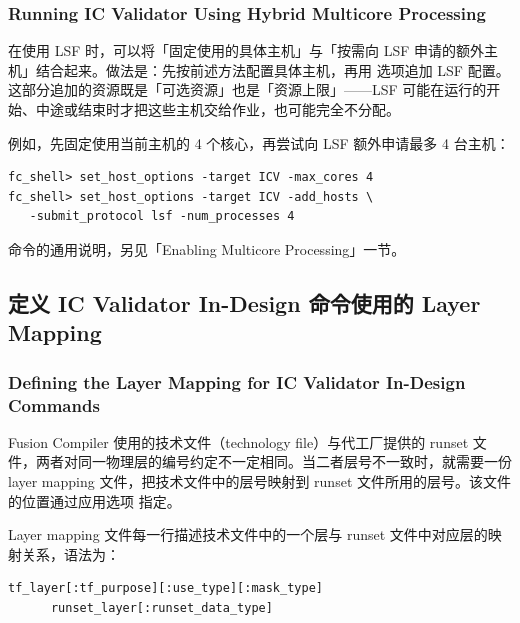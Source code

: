 \subsubsection*{Running IC Validator Using Hybrid Multicore Processing}

在使用 LSF 时，可以将「固定使用的具体主机」与「按需向 LSF 申请的额外主机」结合起来。做法是：先按前述方法配置具体主机，再用  选项追加 LSF 配置。这部分追加的资源既是「可选资源」也是「资源上限」——LSF 可能在运行的开始、中途或结束时才把这些主机交给作业，也可能完全不分配。

例如，先固定使用当前主机的 4 个核心，再尝试向 LSF 额外申请最多 4 台主机：
\begin{lstlisting}
fc_shell> set_host_options -target ICV -max_cores 4
fc_shell> set_host_options -target ICV -add_hosts \
   -submit_protocol lsf -num_processes 4
\end{lstlisting}

\begin{seeAlsoBox}
 命令的通用说明，另见「Enabling Multicore Processing」一节。
\end{seeAlsoBox}

\subsection{定义 IC Validator In-Design 命令使用的 Layer Mapping}
\subsubsection*{Defining the Layer Mapping for IC Validator In-Design Commands}

Fusion Compiler 使用的技术文件（technology file）与代工厂提供的 runset 文件，两者对同一物理层的编号约定不一定相同。当二者层号不一致时，就需要一份 layer mapping 文件，把技术文件中的层号映射到 runset 文件所用的层号。该文件的位置通过应用选项  指定。

Layer mapping 文件每一行描述技术文件中的一个层与 runset 文件中对应层的映射关系，语法为：

\begin{lstlisting}
tf_layer[:tf_purpose][:use_type][:mask_type]
      runset_layer[:runset_data_type]
\end{lstlisting}

